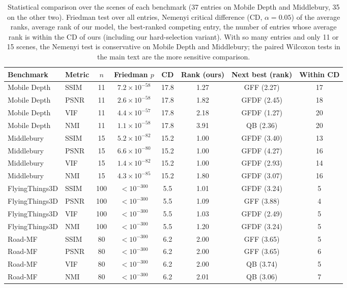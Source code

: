 \begin{table}[t]
\centering
\scriptsize
\setlength{\tabcolsep}{3pt}
\caption{Statistical comparison over the scenes of each benchmark (37 entries on Mobile Depth and Middlebury, 35 on the other two). Friedman test over all entries, Nemenyi critical difference (CD, $\alpha=0.05$) of the average ranks, average rank of our model, the best-ranked competing entry, the number of entries whose average rank is within the CD of ours (including our hard-selection variant). With so many entries and only 11 or 15 scenes, the Nemenyi test is conservative on Mobile Depth and Middlebury; the paired Wilcoxon tests in the main text are the more sensitive comparison.}
\label{tab:stats}
\begin{tabular}{llcccccc}
\toprule
Benchmark & Metric & $n$ & Friedman $p$ & CD & Rank (ours) & Next best (rank) & Within CD \\
\midrule
Mobile Depth & SSIM & 11 & $7.2\times10^{-58}$ & 17.8 & 1.27 & GFF (2.27) & 17 \\
Mobile Depth & PSNR & 11 & $2.6\times10^{-58}$ & 17.8 & 1.82 & GFDF (2.45) & 18 \\
Mobile Depth & VIF & 11 & $4.4\times10^{-57}$ & 17.8 & 2.18 & GFDF (1.27) & 20 \\
Mobile Depth & NMI & 11 & $1.1\times10^{-58}$ & 17.8 & 3.91 & QB (2.36) & 20 \\
Middlebury & SSIM & 15 & $5.2\times10^{-82}$ & 15.2 & 1.00 & GFDF (3.40) & 13 \\
Middlebury & PSNR & 15 & $6.6\times10^{-80}$ & 15.2 & 1.00 & GFDF (4.27) & 16 \\
Middlebury & VIF & 15 & $1.4\times10^{-82}$ & 15.2 & 1.00 & GFDF (2.93) & 14 \\
Middlebury & NMI & 15 & $4.3\times10^{-85}$ & 15.2 & 1.80 & GFDF (3.07) & 16 \\
FlyingThings3D & SSIM & 100 & $<10^{-300}$ & 5.5 & 1.01 & GFDF (3.24) & 5 \\
FlyingThings3D & PSNR & 100 & $<10^{-300}$ & 5.5 & 1.09 & GFF (3.88) & 4 \\
FlyingThings3D & VIF & 100 & $<10^{-300}$ & 5.5 & 1.03 & GFDF (2.49) & 5 \\
FlyingThings3D & NMI & 100 & $<10^{-300}$ & 5.5 & 1.20 & GFDF (3.24) & 5 \\
Road-MF & SSIM & 80 & $<10^{-300}$ & 6.2 & 2.00 & GFF (3.65) & 5 \\
Road-MF & PSNR & 80 & $<10^{-300}$ & 6.2 & 2.00 & GFF (3.65) & 6 \\
Road-MF & VIF & 80 & $<10^{-300}$ & 6.2 & 2.00 & QB (3.74) & 5 \\
Road-MF & NMI & 80 & $<10^{-300}$ & 6.2 & 2.01 & QB (3.06) & 7 \\
\bottomrule
\end{tabular}
\end{table}
